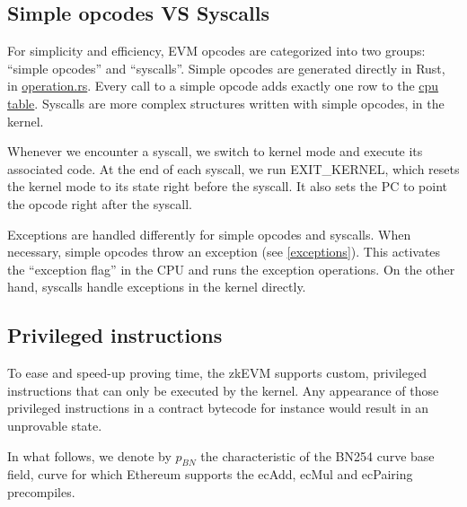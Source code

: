 \subsection{Simple opcodes VS Syscalls}
For simplicity and efficiency, EVM opcodes are categorized into two groups: ``simple opcodes'' and ``syscalls''. Simple opcodes are generated directly in Rust, in \href{https://github.com/0xPolygonZero/plonky2/blob/main/evm/src/witness/operation.rs}{operation.rs}. Every call to a simple opcode adds exactly one row to the \href{https://github.com/0xPolygonZero/plonky2/blob/main/evm/spec/tables/cpu.tex}{cpu table}. Syscalls are more complex structures written with simple opcodes, in the kernel.

Whenever we encounter a syscall, we switch to kernel mode and execute its associated code. At the end of each syscall, we run EXIT\_KERNEL, which resets the kernel mode to its state right before the syscall. It also sets the PC to point the opcode right after the syscall.

Exceptions are handled differently for simple opcodes and syscalls. When necessary, simple opcodes throw an exception (see \ref{exceptions}). This activates the ``exception flag'' in the CPU and runs the exception operations. On the other hand, syscalls handle exceptions in the kernel directly.

\subsection{Privileged instructions}

To ease and speed-up proving time, the zkEVM supports custom, privileged instructions that can only be executed by the kernel.
Any appearance of those privileged instructions in a contract bytecode for instance would result in an unprovable state.

In what follows, we denote by $p_{BN}$ the characteristic of the BN254 curve base field, curve for which Ethereum supports the 
ecAdd, ecMul and ecPairing precompiles.

